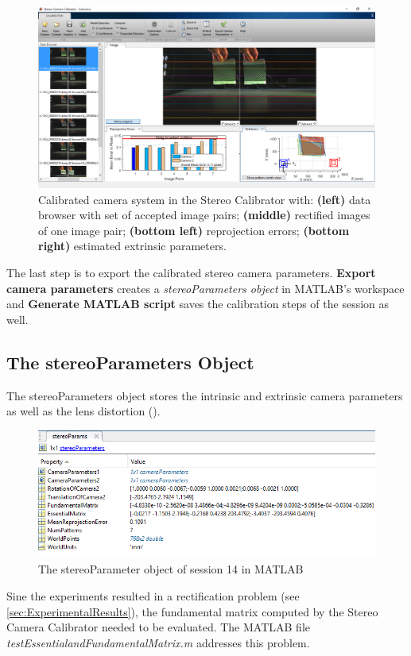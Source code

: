 \begin{figure}[htbp]
		\centering
		\includegraphics[width=1.0\textwidth]{figures/ExRectified}
		\caption[Calibrated camera system in Matlab]{Calibrated camera system in the Stereo Calibrator with: \textbf{(left)} data browser with set of accepted image pairs; \textbf{(middle)} rectified images of one image pair; \textbf{(bottom left)} reprojection errors; \textbf{(bottom right)} estimated extrinsic parameters.}
		\label{fig:ExRectified}
\end{figure}

The last step is to export the calibrated stereo camera parameters. \textbf{Export camera parameters} creates a \textit{stereoParameters object} in MATLAB's workspace and \textbf{Generate MATLAB script} saves the calibration steps of the session as well.

\subsection{The stereoParameters Object}\label{ssec:stereoParamsObj}
The stereoParameters object stores the intrinsic and extrinsic camera parameters as well as the lens distortion (\cite{StereoCalib.2016}).

\begin{figure}[htbp]
		\centering
		\includegraphics[width=1.0\textwidth]{figures/StereoParams}
		\caption[The stereoParameter object of session 14 in MATLAB]{The stereoParameter object of session 14 in MATLAB}
		\label{fig:StereoParams}
\end{figure}

Sine the experiments resulted in a rectification problem (see \autoref{sec:ExperimentalResults}), the fundamental matrix computed by the Stereo Camera Calibrator needed to be evaluated. The MATLAB file \textit{testEssentialandFundamentalMatrix.m} addresses this problem.